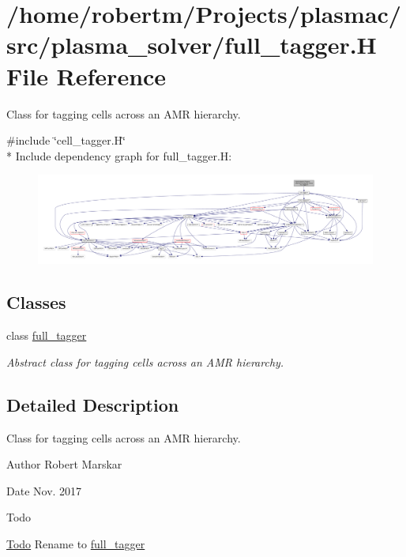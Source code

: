 \hypertarget{full__tagger_8H}{}\section{/home/robertm/\+Projects/plasmac/src/plasma\+\_\+solver/full\+\_\+tagger.H File Reference}
\label{full__tagger_8H}


Class for tagging cells across an A\+MR hierarchy.  


{\ttfamily \#include \char`\"{}cell\+\_\+tagger.\+H\char`\"{}}\\*
Include dependency graph for full\+\_\+tagger.\+H\+:\nopagebreak
\begin{figure}[H]
\begin{center}
\leavevmode
\includegraphics[width=350pt]{full__tagger_8H__incl}
\end{center}
\end{figure}
\subsection*{Classes}
\begin{DoxyCompactItemize}
\item 
class \hyperlink{classfull__tagger}{full\+\_\+tagger}
\begin{DoxyCompactList}\small\item\em Abstract class for tagging cells across an A\+MR hierarchy. \end{DoxyCompactList}\end{DoxyCompactItemize}


\subsection{Detailed Description}
Class for tagging cells across an A\+MR hierarchy. 

\begin{DoxyAuthor}{Author}
Robert Marskar 
\end{DoxyAuthor}
\begin{DoxyDate}{Date}
Nov. 2017 
\end{DoxyDate}
\begin{DoxyRefDesc}{Todo}
\item[\hyperlink{todo__todo000011}{Todo}]Rename to \hyperlink{classfull__tagger}{full\+\_\+tagger} \end{DoxyRefDesc}

